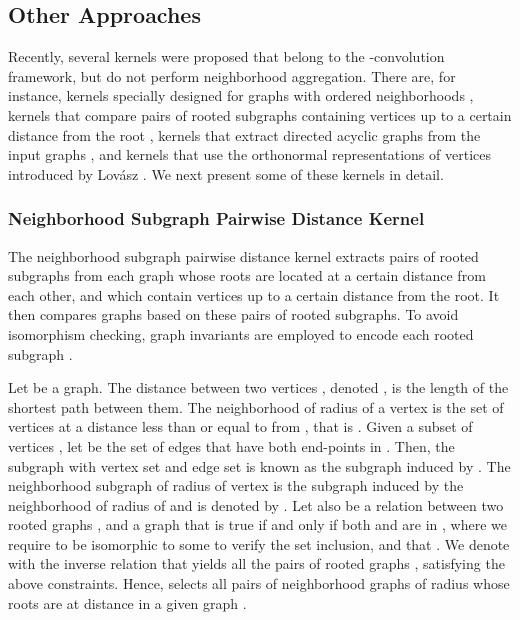 \documentclass[twoside,11pt]{article}
\begin{document}
\subsection{Other Approaches}
Recently, several kernels were proposed that belong to the -convolution framework, but do not perform neighborhood aggregation.
There are, for instance, kernels specially designed for graphs with ordered neighborhoods , kernels that compare pairs of rooted subgraphs containing vertices up to a certain distance from the root , kernels that extract directed acyclic graphs from the input graphs , and kernels that use the orthonormal representations of vertices introduced by Lov\'asz .
We next present some of these kernels in detail.

\subsubsection{Neighborhood Subgraph Pairwise Distance Kernel}
The neighborhood subgraph pairwise distance kernel extracts pairs of rooted subgraphs from each graph whose roots are located at a certain distance from each other, and which contain vertices up to a certain distance from the root.
It then compares graphs based on these pairs of rooted subgraphs.
To avoid isomorphism checking, graph invariants are employed to encode each rooted subgraph .

Let  be a graph.
The distance between two vertices , denoted , is the length of the shortest path between them.
The neighborhood of radius  of a vertex  is the set of vertices at a distance less than or equal to  from , that is .
Given a subset of vertices , let  be the set of edges that have both end-points in .
Then, the subgraph with vertex set  and edge set  is known as the subgraph induced by .
The neighborhood subgraph of radius  of vertex  is the subgraph induced by the neighborhood of radius  of  and is denoted by .
Let also  be a relation between two rooted graphs ,  and a graph  that is true if and only if both  and  are in , where we require  to be isomorphic to some  to verify the set inclusion, and that .
We denote with  the inverse relation that yields all the pairs of rooted graphs ,  satisfying the above constraints.
Hence,  selects all pairs of neighborhood graphs of radius  whose roots are at distance  in a given graph .
\end{document}

